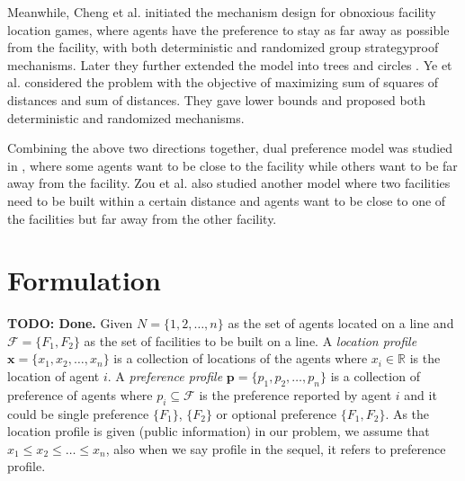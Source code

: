 \documentclass[twoside,11pt]{article}
\newcommand{\bd}{\mathbf}
\newcommand{\todo}[1]{}
\renewcommand{\todo}[1]{{\textbf{\color{red} TODO: {#1}}}}
\begin{document}

Meanwhile, Cheng et al. \cite{cheng2011mechanisms} initiated the mechanism design for obnoxious facility location games, where agents have the preference to stay as far away as possible from the facility, with both deterministic and randomized group strategyproof mechanisms. Later they further extended the model into trees and circles \cite{cheng2013strategy}. Ye et al. \cite{ye2015strategy} considered the problem with the objective of maximizing sum of squares of distances and sum of distances. They gave lower bounds and proposed both deterministic and randomized mechanisms.

Combining the above two directions together, dual preference model was studied in \cite{ZouL15,feigenbaum2015strategyproof}, where some agents want to be close to the facility while others want to be far away from the facility. Zou et al. \cite{ZouL15} also studied another model where two facilities need to be built within a certain distance and agents want to be close to one of the facilities but far away from the other facility.

\section{Formulation}
\label{sec-formulation}
\todo{Done.}
Given $N =\{1, 2, \dots, n\}$ as the set of agents located on a line and $\mathcal{F} = \{F_{1}, F_{2}\}$ as the set of facilities to be built on a line.
%
A \emph{location profile} $\bd{x}=\{x_1,x_2,\dots,x_n\}$ is a collection of locations of the agents where $x_{i} \in \mathbb{R}$ is the location of agent $i$.
A \emph{preference profile} $\bd{p} = \{p_{1}, p_{2}, \dots, p_{n} \}$ is a collection of preference of agents where $p_{i} \subseteq \mathcal{F}$ is the preference reported by agent $i$ and it could be single preference $\{F_1\}$, $\{F_2\}$ or optional preference $\{F_1, F_2\}$.
As the location profile is given (public information) in our problem,
we assume that $x_1\leq x_2 \leq \dots \leq x_n$, also when we say profile in the sequel, it refers to preference profile.

\end{document}
